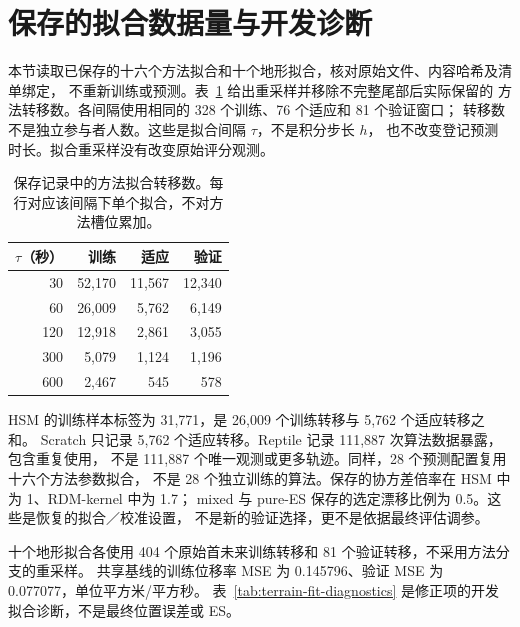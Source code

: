 \section{保存的拟合数据量与开发诊断}
\label{sec:saved-fit-diagnostics}\hypertarget{sec:saved-fit-diagnostics}{}
本节读取已保存的十六个方法拟合和十个地形拟合，核对原始文件、内容哈希及清单绑定，
不重新训练或预测。表~\ref{tab:fit-transition-counts} 给出重采样并移除不完整尾部后实际保留的
方法转移数。各间隔使用相同的 328 个训练、76 个适应和 81 个验证窗口；
转移数不是独立参与者人数。这些是拟合间隔 \(\tau\)，不是积分步长 \(h\)，
也不改变登记预测时长。拟合重采样没有改变原始评分观测。

\begin{table}[htbp]
\centering\small
\caption{保存记录中的方法拟合转移数。每行对应该间隔下单个拟合，不对方法槽位累加。}
\label{tab:fit-transition-counts}\hypertarget{tab:fit-transition-counts}{}
\begin{tabular}{rrrr}
\toprule
\(\tau\)（秒） & 训练 & 适应 & 验证\\
\midrule
30 & 52,170 & 11,567 & 12,340\\
60 & 26,009 & 5,762 & 6,149\\
120 & 12,918 & 2,861 & 3,055\\
300 & 5,079 & 1,124 & 1,196\\
600 & 2,467 & 545 & 578\\
\bottomrule
\end{tabular}
\end{table}

HSM 的训练样本标签为 31,771，是 26,009 个训练转移与 5,762 个适应转移之和。
Scratch 只记录 5,762 个适应转移。Reptile 记录 111,887 次算法数据暴露，包含重复使用，
不是 111,887 个唯一观测或更多轨迹。同样，28 个预测配置复用十六个方法参数拟合，
不是 28 个独立训练的算法。保存的协方差倍率在 HSM 中为 1、RDM-kernel 中为 1.7；
mixed 与 pure-ES 保存的选定漂移比例为 0.5。这些是恢复的拟合／校准设置，
不是新的验证选择，更不是依据最终评估调参。

十个地形拟合各使用 404 个原始首未来训练转移和 81 个验证转移，不采用方法分支的重采样。
共享基线的训练位移率 MSE 为 0.145796、验证 MSE 为 0.077077，单位平方米/平方秒。
表~\ref{tab:terrain-fit-diagnostics} 是修正项的开发拟合诊断，不是最终位置误差或 ES。

